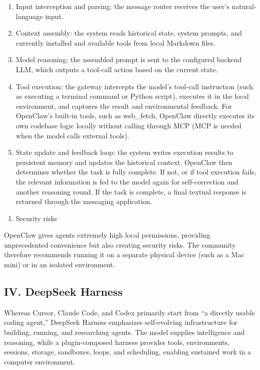 \begin{enumerate}
\def\labelenumi{\arabic{enumi}.}
\item
  Input interception and parsing: the message router receives the user's natural-language input.
\item
  Context assembly: the system reads historical state, system prompts, and currently installed and available tools from local Markdown files.
\item
  Model reasoning: the assembled prompt is sent to the configured backend LLM, which outputs a tool-call action based on the current state.
\item
  Tool execution: the gateway intercepts the model's tool-call instruction (such as executing a terminal command or Python script), executes it in the local environment, and captures the result and environmental feedback. For OpenClaw's built-in tools, such as web\_fetch, OpenClaw directly executes its own codebase logic locally without calling through MCP (MCP is needed when the model calls external tools).
\item
  State update and feedback loop: the system writes execution results to persistent memory and updates the historical context. OpenClaw then determines whether the task is fully complete. If not, or if tool execution fails, the relevant information is fed to the model again for self-correction and another reasoning round. If the task is complete, a final textual response is returned through the messaging application.
\end{enumerate}

\begin{enumerate}
\def\labelenumi{(\Roman{enumi})}
\setcounter{enumi}{2}
\tightlist
\item
  Security risks
\end{enumerate}

OpenClaw gives agents extremely high local permissions, providing unprecedented convenience but also creating security risks. The community therefore recommends running it on a separate physical device (such as a Mac mini) or in an isolated environment.

\hypertarget{iv.-deepseek-harness}{%
\subsection{IV. DeepSeek Harness}\label{iv.-deepseek-harness}}

Whereas Cursor, Claude Code, and Codex primarily start from ``a directly usable coding agent,'' DeepSeek Harness emphasizes self-evolving infrastructure for building, running, and researching agents. The model supplies intelligence and reasoning, while a plugin-composed harness provides tools, environments, sessions, storage, sandboxes, loops, and scheduling, enabling sustained work in a computer environment.

